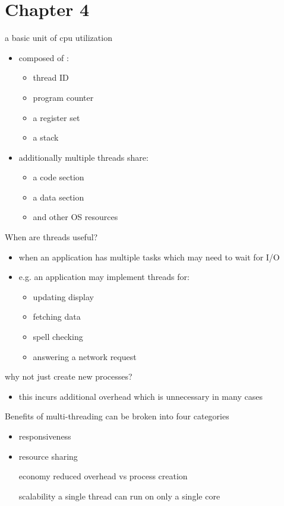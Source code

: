 \documentclass[11pt]{article}
\begin{document}
\section{Chapter 4}
\label{sec:orgec92b69}
\begin{description}
\item[{thread}] a basic unit of cpu utilization
\begin{itemize}
\item composed of :
\begin{itemize}
\item thread ID
\item program counter
\item a register set
\item a stack
\end{itemize}
\item additionally multiple threads share:
\begin{itemize}
\item a code section
\item a data section
\item and other OS resources
\end{itemize}
\end{itemize}
\item When are threads useful?
\begin{itemize}
\item when an application has multiple tasks which may need to wait for I/O
\item e.g. an application may implement threads for:
\begin{itemize}
\item updating display
\item fetching data
\item spell checking
\item answering a network request
\end{itemize}
\end{itemize}
\item why not just create new processes?
\begin{itemize}
\item this incurs additional overhead which is unnecessary in many cases
\end{itemize}
\item Benefits of multi-threading can be broken into four categories
\begin{itemize}
\item responsiveness
\item resource sharing
\item[{economy}] reduced overhead vs process creation
\item[{scalability}] a single thread can run on only a single core
\end{itemize}
\end{description}
\end{document}
